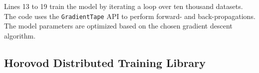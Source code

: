 Lines 13 to 19 train the model by iterating a loop over ten thousand datasets.
The code uses the {\tt GradientTape} API to perform forward- and
back-propagations. 
The model parameters are optimized based on the chosen gradient descent
algorithm.

\subsection{Horovod Distributed Training Library}

